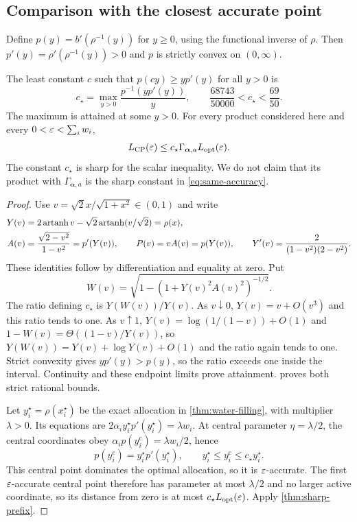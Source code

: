 \subsection{Comparison with the closest accurate point}
Define $p(y)=b'(\rho^{-1}(y))$ for $y\geq0$, using the functional inverse
of $\rho$. Then $p'(y)=\rho'(\rho^{-1}(y))>0$ and $p$ is strictly convex
on $(0,\infty)$.
\begin{theorem}
\label{thm:scalar-dilation}
The least constant $c$ such that $p(cy)\geq yp'(y)$ for all $y>0$ is
\begin{equation}
 c_\star=\max_{y>0}\frac{p^{-1}(yp'(y))}{y},\qquad
 \frac{68743}{50000}<c_\star<\frac{69}{50}.
 \label{eq:cstar}
\end{equation}
The maximum is attained at some $y>0$. For every product considered
here and every $0<\varepsilon<\sum_iw_i$,
\begin{equation}
 L_{\mathrm{CP}}(\varepsilon)\leq c_\star\Gamma_{\boldsymbol\alpha,a}L_{\mathrm{opt}}(\varepsilon).
 \label{eq:same-accuracy}
\end{equation}
The constant $c_\star$ is sharp for the scalar inequality. We do not
claim that its product with $\Gamma_{\boldsymbol\alpha,a}$ is the sharp
constant in \eqref{eq:same-accuracy}.
\end{theorem}
\begin{proof}
Use $v=\sqrt2x/\sqrt{1+x^2}\in(0,1)$ and write
\begin{align}
 Y(v)&=2\operatorname{artanh}v-
             \sqrt2\operatorname{artanh}(v/\sqrt2)=\rho(x),\notag\\
 A(v)&=\frac{\sqrt{2-v^2}}{1-v^2}=p'(Y(v)),\qquad
 P(v)=vA(v)=p(Y(v)),\qquad
 Y'(v)=\frac2{(1-v^2)(2-v^2)}.
 \label{eq:scalar-elementary}
\end{align}
These identities follow by differentiation and equality at zero. Put
\[
 W(v)=\sqrt{1-(1+Y(v)^2A(v)^2)^{-1/2}}.
\]
The ratio defining $c_\star$ is $Y(W(v))/Y(v)$. As $v\downarrow0$, $Y(v)=v+O(v^3)$ and this ratio
tends to one. As $v\uparrow1$, $Y(v)=\log(1/(1-v))+O(1)$ and
$1-W(v)=\Theta((1-v)/Y(v))$, so
$Y(W(v))=Y(v)+\log Y(v)+O(1)$ and the ratio again tends to one.
Strict convexity gives $yp'(y)>p(y)$, so the ratio exceeds one inside
the interval. Continuity and these endpoint limits prove attainment.
 proves both strict rational bounds.

Let $y_i^\star=\rho(x_i^\star)$ be the exact allocation in
\cref{thm:water-filling}, with multiplier $\lambda>0$.
Its equations are $2\alpha_i y_i^\star p'(y_i^\star)=\lambda w_i$.
At central parameter $\eta=\lambda/2$, the central coordinates obey
$\alpha_i p(y_i^{\mathrm c})=\lambda w_i/2$, hence
\[
 p(y_i^{\mathrm c})=y_i^\star p'(y_i^\star),\qquad
 y_i^\star\leq y_i^{\mathrm c}\leq c_\star y_i^\star.
\]
This central point dominates the optimal allocation, so it is
$\varepsilon$-accurate. The first $\varepsilon$-accurate central point therefore has
parameter at most $\lambda/2$ and no larger active coordinate, so its
distance from zero is at most
$c_\star L_{\mathrm{opt}}(\varepsilon)$. Apply \cref{thm:sharp-prefix}.
\end{proof}
